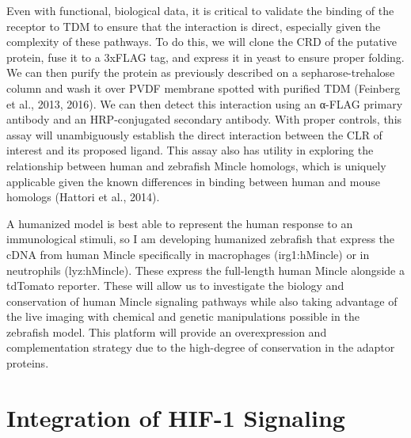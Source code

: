 \doublespacing

Even with functional, biological data, it is critical to validate the binding of the receptor to TDM to ensure that the interaction is direct, especially given the complexity of these pathways. To do this, we will clone the CRD of the putative protein, fuse it to a 3xFLAG tag, and express it in yeast to ensure proper folding. We can then purify the protein as previously described on a sepharose-trehalose column and wash it over PVDF membrane spotted with purified TDM (Feinberg et al., 2013, 2016). We can then detect this interaction using an α-FLAG primary antibody and an HRP-conjugated secondary antibody. With proper controls, this assay will unambiguously establish the direct interaction between the CLR of interest and its proposed ligand. This assay also has utility in exploring the relationship between human and zebrafish Mincle homologs, which is uniquely applicable given the known differences in binding between human and mouse homologs (Hattori et al., 2014).

A humanized model is best able to represent the human response to an immunological stimuli, so I am developing humanized zebrafish that express the cDNA from human Mincle specifically in macrophages (irg1:hMincle) or in neutrophils (lyz:hMincle). These express the full-length human Mincle alongside a tdTomato reporter. These will allow us to investigate the biology and conservation of human Mincle signaling pathways while also taking advantage of the live imaging with chemical and genetic manipulations possible in the zebrafish model. This platform will provide an overexpression and complementation strategy due to the high-degree of conservation in the adaptor proteins. 

\section{Integration of HIF-1\textalpha{} Signaling}

